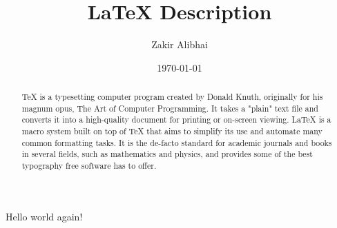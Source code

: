 \documentclass[letterpaper,notitlepage,11pt]{article}
\begin{document}
\title{LaTeX Description}
\author{Zakir Alibhai}
\date{\today}
\maketitle
\begin{abstract}
TeX is a typesetting computer program created by Donald Knuth, originally for his magnum opus, The Art of Computer Programming. It takes a "plain" text file and converts it into a high-quality document for printing or on-screen viewing. LaTeX is a macro system built on top of TeX that aims to simplify its use and automate many common formatting tasks. It is the de-facto standard for academic journals and books in several fields, such as mathematics and physics, and provides some of the best typography free software has to offer.
\end{abstract}
Hello {\color{red} world} again!
\end{document}
